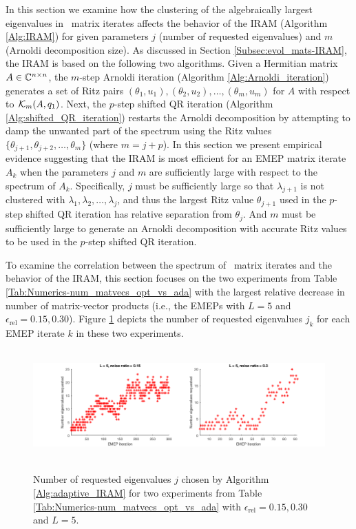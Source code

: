 In this section we examine how the clustering of the algebraically largest eigenvalues in \emep \ matrix iterates affects the behavior of the IRAM (Algorithm \ref{Alg:IRAM}) for given parameters $j$ (number of requested eigenvalues) and $m$ (Arnoldi decomposition size).
As discussed in Section \ref{Subsec:evol_mats-IRAM}, the IRAM is based on the following two algorithms.
Given a Hermitian matrix $A \in {\mathbb C}^{n \times n}$, the $m$-step Arnoldi iteration (Algorithm \ref{Alg:Arnoldi_iteration}) generates a set of Ritz pairs $(\theta_1, u_1), (\theta_2, u_2), \ldots, (\theta_m, u_m)$ for $A$ with respect to ${\mathcal K}_m(A, q_1)$.
Next, the $p$-step shifted QR iteration (Algorithm \ref{Alg:shifted_QR_iteration}) restarts the Arnoldi decomposition by attempting to damp the unwanted part of the spectrum using the Ritz values $\{ \theta_{j+1}, \theta_{j+2}, \ldots, \theta_m \}$ (where $m = j + p$).
In this section we present empirical evidence suggesting that the IRAM is  most efficient for an EMEP matrix iterate $A_k$ when the parameters $j$ and $m$ are sufficiently large with respect to the spectrum of $A_k$.
Specifically, $j$ must be sufficiently large so that $\lambda_{j+1}$ is not clustered with $\lambda_1, \lambda_2, \ldots, \lambda_j$, and thus the largest Ritz value $ \theta_{j+1}$ used in the $p$-step shifted QR iteration has relative separation from $\theta_j$.
And $m$ must be sufficiently large to generate an Arnoldi decomposition with accurate Ritz values to be used in the $p$-step shifted QR iteration.






To examine the correlation between the spectrum of \emep \ matrix iterates and the behavior of the IRAM, this section focuses on the two experiments from Table \ref{Tab:Numerics-num_matvecs_opt_vs_ada} with the largest relative decrease in number of matrix-vector products (i.e., the EMEPs with $L = 5$ and $\epsilon_\text{rel} = 0.15, 0.30$).
Figure \ref{Fig:Numerics-num_req_eigs_2_exps} depicts the number of requested eigenvalues $j_k$ for each EMEP iterate $k$ in these two experiments.


\begin{figure}[H]
\centering
\hbox{\hspace{-1.8cm} \includegraphics[scale=0.6]{Numerics-num_eigs_req_ada_2_exps} }\vspace{0.0cm}
	\caption{Number of requested eigenvalues $j$ chosen by Algorithm \ref{Alg:adaptive_IRAM} for two experiments from Table \ref{Tab:Numerics-num_matvecs_opt_vs_ada} with $\epsilon_\text{rel}=0.15, 0.30$ and $L=5$.}
\label{Fig:Numerics-num_req_eigs_2_exps}
\end{figure}


